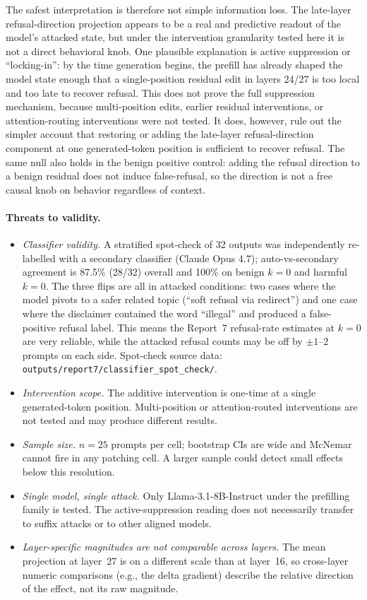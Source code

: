 \documentclass{article}
\begin{document}
The safest interpretation is therefore not simple information loss. The
late-layer refusal-direction projection appears to be a real and
predictive readout of the model's attacked state, but under the
intervention granularity tested here it is not a direct behavioral knob.
One plausible explanation is active suppression or
``locking-in'': by the time generation begins, the prefill has already
shaped the model state enough that a single-position residual edit in
layers 24/27 is too local and too late to recover refusal. This does not
prove the full suppression mechanism, because multi-position edits,
earlier residual interventions, or attention-routing interventions were
not tested. It does, however, rule out the simpler account that restoring
or adding the late-layer refusal-direction component at one generated-token
position is sufficient to recover refusal. The same null also holds in the
benign positive control: adding the refusal direction to a benign
residual does not induce false-refusal, so the direction is not a free
causal knob on behavior regardless of context.

\paragraph{Threats to validity.}
\begin{itemize}
\item \emph{Classifier validity.} A stratified spot-check of 32 outputs
  was independently re-labelled with a secondary classifier
  (Claude Opus 4.7); auto-vs-secondary agreement is 87.5\% (28/32) overall
  and 100\% on benign $k=0$ and harmful $k=0$. The three flips are all in
  attacked conditions: two cases where the model pivots to a safer related
  topic (``soft refusal via redirect'') and one case where the disclaimer
  contained the word ``illegal'' and produced a false-positive refusal
  label. This means the Report~7 refusal-rate estimates at $k=0$ are very
  reliable, while the attacked refusal counts may be off by $\pm 1$--$2$
  prompts on each side. Spot-check source data:
  \texttt{outputs/report7/classifier\_spot\_check/}.
\item \emph{Intervention scope.} The additive intervention is one-time at a
  single generated-token position. Multi-position or attention-routed
  interventions are not tested and may produce different results.
\item \emph{Sample size.} $n=25$ prompts per cell; bootstrap CIs are wide
  and McNemar cannot fire in any patching cell. A larger sample could
  detect small effects below this resolution.
\item \emph{Single model, single attack.} Only Llama-3.1-8B-Instruct under
  the prefilling family is tested. The active-suppression reading does not
  necessarily transfer to suffix attacks or to other aligned models.
\item \emph{Layer-specific magnitudes are not comparable across layers.}
  The mean projection at layer~27 is on a different scale than at
  layer~16, so cross-layer numeric comparisons (e.g., the delta gradient)
  describe the relative direction of the effect, not its raw magnitude.
\end{itemize}
\end{document}
